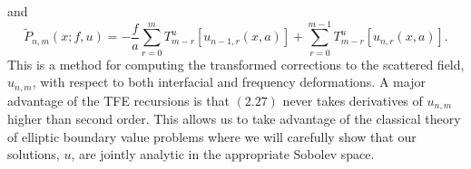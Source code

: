 and
\begin{equation}\tilde{P}_{n,m}(x;f,u) = -\frac{f}{a} \sum_{r=0}^m T^u_{m-r}[u_{n-1,r}(x,a)] + \sum_{r=0}^{m-1}T_{m-r}^u[u_{n,r}(x,a)].
\end{equation}
This is a method for computing the transformed corrections to the scattered field, $u_{n,m}$, with respect to both interfacial and frequency deformations. A major advantage of the TFE recursions is that $(2.27)$ never takes derivatives of $u_{n,m}$ higher than second order. This allows us to take advantage of the classical theory of elliptic boundary value problems where we will carefully  show that our solutions, $u$, are jointly analytic in the appropriate Sobolev space.